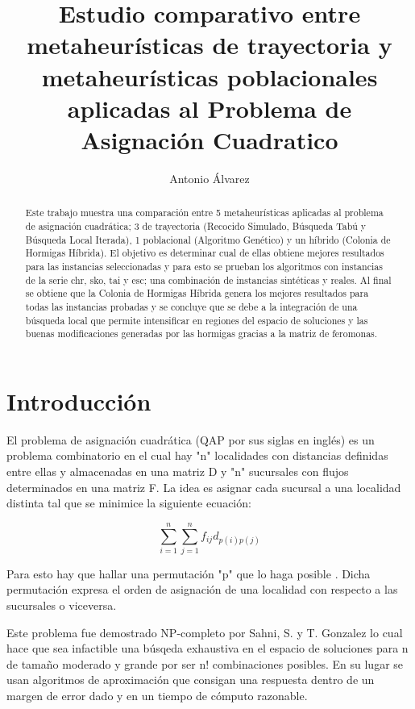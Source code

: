 \documentclass{ci5652}
\title{Estudio comparativo entre metaheurísticas de trayectoria y metaheurísticas poblacionales aplicadas al Problema de Asignación Cuadratico}
\author{Antonio Álvarez}
\begin{document}
\thispagestyle{empty}
\maketitle

\begin{abstract}
Este trabajo muestra una comparación entre 5 metaheurísticas aplicadas al problema de asignación cuadrática; 3 de trayectoria (Recocido Simulado, Búsqueda Tabú y Búsqueda Local Iterada), 1 poblacional (Algoritmo Genético) y un híbrido (Colonia de Hormigas Híbrida). El objetivo es determinar cual de ellas obtiene mejores resultados para las instancias seleccionadas y para esto se prueban los algoritmos con instancias de la serie chr, sko, tai y esc; una combinación de instancias sintéticas y reales. Al final se obtiene que la Colonia de Hormigas Híbrida genera los mejores resultados para todas las instancias probadas y se concluye que se debe a la integración de una búsqueda local que permite intensificar en regiones del espacio de soluciones y las buenas modificaciones generadas por las hormigas gracias a la matriz de feromonas. 
\end{abstract}

\section{Introducción}

El problema de asignación cuadrática (QAP por sus siglas en inglés) es un problema combinatorio en el cual hay "n" localidades con distancias definidas entre ellas y almacenadas en una matriz D y "n" sucursales con flujos determinados en una matriz F. La idea es asignar cada sucursal a una localidad distinta tal que se minimice la siguiente ecuación: 

\begin {equation*}
\sum_{i=1}^{n} \sum_{j=1}^{n} f_{ij} d_{p(i)p(j)}
\end {equation*}

Para esto hay que hallar una permutación "p"  que lo haga posible \cite{1}. Dicha permutación expresa el orden de asignación de una localidad con respecto a las sucursales o viceversa.

Este problema fue demostrado NP-completo por Sahni, S. y T. Gonzalez \cite{2} lo cual hace que sea infactible una búsqeda exhaustiva en el espacio de soluciones para n de tamaño moderado y grande por ser n! combinaciones posibles. En su lugar se usan algoritmos de aproximación que consigan una respuesta dentro de un margen de error dado y en un tiempo de cómputo razonable.
\end{document}
